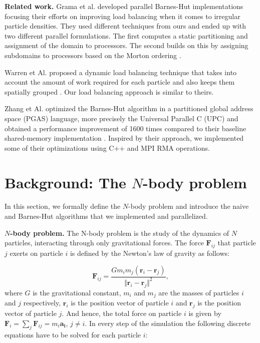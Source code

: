 \documentclass[letterpaper]{article}
\newcommand{\mypar}[1]{{\bf #1.}}
\begin{document}
\mypar{Related work} Grama et al. developed parallel Barnes-Hut implementations focusing their efforts on improving load balancing when it comes to irregular particle densities. They used different techniques from ours and ended up with two different parallel formulations. The first computes a static partitioning and assignment of the domain to processors. The second builds on this by assigning subdomains to processors based on the Morton ordering \cite{BHscalable}.

Warren et Al. proposed a dynamic load balancing technique that takes into account the amount of work required for each particle and also keeps them spatially grouped \cite{BHbalancing}. Our load balancing approach is similar to theirs.

Zhang et Al. optimized the Barnes-Hut algorithm in a partitioned global address space (PGAS) language, more precisely the Universal Parallel C (UPC) and obtained a performance improvement of 1600 times compared to their baseline shared-memory implementation \cite{UPC}. Inspired by their approach, we implemented some of their optimizations using C++ and MPI RMA operations.

\section{Background: The $N$-body problem}\label{sec:background}

In this section, we formally define the $N$-body problem and introduce the naive and Barnes-Hut algorithms that we implemented and parallelized. 

\mypar{$N$-body problem}
The N-body problem is the study of the dynamics of $N$ particles, interacting through only gravitational forces. The force $\mathbf{F}_{ij}$ that particle $j$ exerts on particle $i$ is defined by the Newton's law of gravity as follows: 

\begin{equation}
    \mathbf{F}_{ij} = \frac{G m_i m_j(\mathbf{r}_i-\mathbf{r}_j)}{\Vert \mathbf{r}_i-\mathbf{r}_j\Vert^2},
\end{equation}
where $G$ is the gravitational constant, $m_i$ and $m_j$ are the masses of particles $i$ and $j$ respectively, $\mathbf{r}_i$ is the position vector of particle $i$ and $\mathbf{r}_j$ is the position vector of particle $j$. And hence, the total force on particle $i$ is given by $ \mathbf{F}_{i} {=} \sum_{j} \mathbf{F}_{ij} {=} m_i \mathbf{a_i}$,  $j{\ne} i$. In every step of the simulation the following discrete equations have to be solved for each particle $i$:
\end{document}
